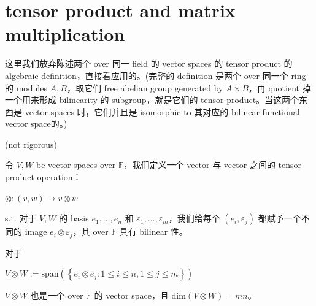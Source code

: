 \chapter{tensor product and matrix multiplication}

这里我们放弃陈述两个 over 同一 field 的 vector spaces 的 tensor product 的 algebraic definition，直接看应用的。(完整的 definition 是两个 over 同一个 ring 的 modules \(A,B\)，取它们 free abelian group generated by \(A \times B\)，再 quotient 掉一个用来形成 bilinearity 的 subgroup，就是它们的 tensor product。当这两个东西是 vector spaces 时，它们并且是 isomorphic to 其对应的 bilinear functional vector space的。)

\begin{definition}{(not rigorous) }

令 \(V,W\) be vector spaces over \(\mathbb{F}\)，我们定义一个 vector 与 vector 之间的 tensor product operation：

\(\otimes :\left( {v,w} \right)\rightarrow v \otimes w\)

s.t. 对于 \(V,W\) 的 basis \(e_{1},\ldots,e_{n}\) 和 \(\varepsilon_{1},\ldots,\varepsilon_{m}\)，我们给每个 \(\left( {e_{i},\varepsilon_{j}} \right)\) 都赋予一个不同的 image \(e_{i} \otimes \varepsilon_{j}\)，其 over \(\mathbb{F}\) 具有 bilinear 性。

对于

\(V \otimes W := \text{span}\left( \left\{ {e_{i} \otimes e_{j}:1 \leq i \leq n,1 \leq j \leq m} \right\} \right)\)

\(V \otimes W\) 也是一个 over \(\mathbb{F}\) 的 vector space，且 \(\text{dim}\left( {V \otimes W} \right) = mn\)。

\end{definition}

